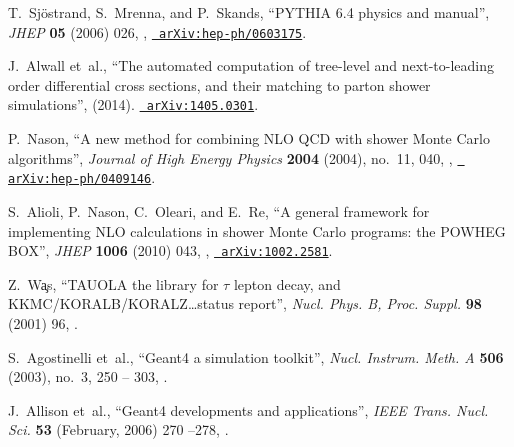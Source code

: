 \documentclass[12pt]{thesis}  %
\begin{document}
\begin{thebibliography}{100}
\hrefCMSnoop {} {T.~Sj{\"o}strand, S.~Mrenna, and P.~Skands, ``{PYTHIA} 6.4
  physics and manual'',} \textit{ JHEP} \textbf{ 05} (2006) 026,
  \href{http://dx.doi.org/10.1088/1126-6708/2006/05/026}{},
\href{http://www.arXiv.org/abs/hep-ph/0603175}{\texttt{ arXiv:hep-ph/0603175}}.

J.~Alwall\hrefCMSnoop {} { {et~al.}, ``The automated computation of tree-level
  and next-to-leading order differential cross sections, and their matching to
  parton shower simulations'',} (2014).
\href{http://www.arXiv.org/abs/1405.0301}{\texttt{ arXiv:1405.0301}}.

\hrefCMSnoop {} {P.~Nason, ``A new method for combining NLO QCD with shower
  Monte Carlo algorithms'',} \textit{ Journal of High Energy Physics} \textbf{
  2004} (2004), no.~11, 040,
  \href{http://dx.doi.org/10.1088/1126-6708/2004/11/040}{},
  \href{http://www.arXiv.org/abs/hep-ph/0409146}{\texttt{
  arXiv:hep-ph/0409146}}.

\hrefCMSnoop {} {S.~Alioli, P.~Nason, C.~Oleari, and E.~Re, ``{A general
  framework for implementing NLO calculations in shower Monte Carlo programs:
  the POWHEG BOX}'',} \textit{ JHEP} \textbf{ 1006} (2010) 043,
  \href{http://dx.doi.org/10.1007/JHEP06(2010)043}{},
\href{http://www.arXiv.org/abs/1002.2581}{\texttt{ arXiv:1002.2581}}.

\hrefCMSnoop {} {Z.~W\c{a}s, ``{TAUOLA} the library for $\tau$ lepton decay,
  and {KKMC/KORALB/KORALZ}\ldots status report'',} \textit{ Nucl. Phys. B,
  Proc. Suppl.} \textbf{ 98} (2001) 96,
  \href{http://dx.doi.org/10.1016/S0920-5632(01)01200-2}{}.

S.~Agostinelli\hrefCMSnoop {} { {et~al.}, ``Geant4 a simulation toolkit'',}
  \textit{ Nucl. Instrum. Meth. A} \textbf{ 506} (2003), no.~3, 250 -- 303,
  \href{http://dx.doi.org/10.1016/S0168-9002(03)01368-8}{}.

J.~Allison\hrefCMSnoop {} { {et~al.}, ``Geant4 developments and
  applications'',} \textit{ {IEEE} Trans. Nucl. Sci.} \textbf{ 53} (February,
  2006) 270 --278,
  \href{http://dx.doi.org/10.1109/TNS.2006.869826}{}.


\end{thebibliography}
\end{document}
